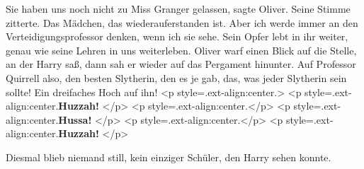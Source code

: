 \glqq Sie haben uns noch nicht zu Miss Granger gelassen\grqq{}, sagte Oliver.
Seine Stimme zitterte. \glqq Das Mädchen, das wiederauferstanden ist. Aber ich
werde immer an den Verteidigungsprofessor denken, wenn ich sie sehe. Sein Opfer
lebt in ihr weiter, genau wie seine Lehren in uns weiterleben.\grqq{} Oliver
warf einen Blick auf die Stelle, an der Harry saß, dann sah er wieder auf das
Pergament hinunter. \glqq Auf Professor Quirrell also, den besten Slytherin, den
es je gab, das, was jeder Slytherin sein sollte! Ein dreifaches Hoch auf
ihn!\grqq{} <p style=\grqq{}.ext-align:center\grqq{}.> <p
style=\grqq{}.ext-align:center\grqq{}.\textbf{\glqq Huzzah! }</p> <p
style=\grqq{}.ext-align:center\grqq{}.</p> <p
style=\grqq{}.ext-align:center\grqq{}.\textbf{Hussa! }</p> <p
style=\grqq{}.ext-align:center\grqq{}.</p> <p
style=\grqq{}.ext-align:center\grqq{}.\textbf{Huzzah!\grqq{} }</p>

Diesmal blieb niemand still, kein einziger Schüler, den Harry sehen konnte.

